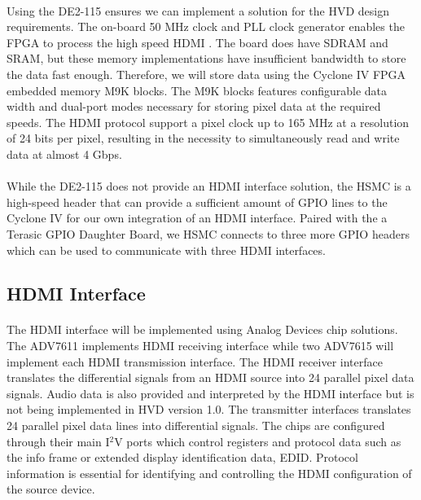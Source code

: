 \documentclass[pdftex,12pt,a4paper]{article}
\begin{document}
\paragraph{}
Using the DE2-115 ensures we can implement a solution for the HVD design requirements. The on-board 50 MHz clock and PLL clock generator enables the FPGA to process the high speed HDMI . The board does have SDRAM and SRAM, but these memory implementations have insufficient bandwidth to store the data fast enough\cite{UserManual_DE2}. Therefore, we will store data using the Cyclone IV FPGA embedded memory M9K blocks. The M9K blocks features configurable data width and dual-port modes necessary for storing pixel data at the required speeds\cite{TechDoc_M9K}. The HDMI protocol support a pixel clock up to 165 MHz at a resolution of 24 bits per pixel, resulting in the necessity to simultaneously read and write data at almost 4 Gbps\cite{TechDoc_HDMI_Spec}.

\paragraph{}
While the DE2-115 does not provide an HDMI interface solution, the HSMC is a high-speed header that can provide a sufficient amount of GPIO lines to the Cyclone IV for our own integration of an HDMI interface. Paired with the a Terasic GPIO Daughter Board, we HSMC connects to three more GPIO headers\cite{UserManual_THDB-HTG} which can be used to communicate with three HDMI interfaces.

\subsection{HDMI Interface}

\paragraph{}
The HDMI interface will be implemented using Analog Devices chip solutions. The ADV7611 implements HDMI receiving interface while two ADV7615 will implement each HDMI transmission interface. The HDMI receiver interface translates the differential signals from an HDMI source into 24 parallel pixel data signals\cite{DataSheet_ADV7611}. Audio data is also provided and interpreted by the HDMI interface but is not being implemented in HVD version 1.0. The transmitter interfaces translates 24 parallel pixel data lines into differential signals\cite{DataSheet_ADV7513}. The chips are configured through their main I$^2$V ports which control registers and protocol data such as the info frame or extended display identification data, EDID. Protocol information is essential for identifying and controlling the HDMI configuration of the source device\cite{TechDoc_HDMI_Spec}.
\end{document}
